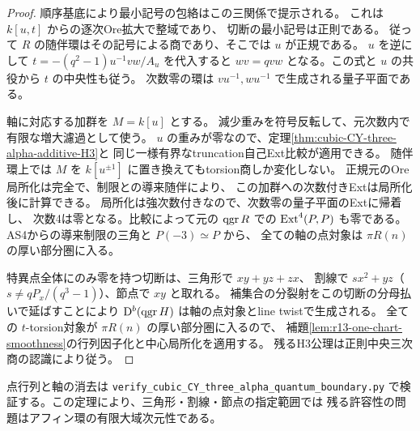 \begin{proof}
順序基底により最小記号の包絡はこの三関係で提示される。
これは $k[u,t]$ からの逐次Ore拡大で整域であり、
切断の最小記号は正則である。
従って $R$ の随伴環はその記号による商であり、そこでは $u$ が正規である。
$u$ を逆にして $t=- (q^2-1)u^{-1}vw/A_u$ を代入すると
$wv=qvw$ となる。この式と $u$ の共役から $t$ の中央性も従う。
次数零の環は $vu^{-1},wu^{-1}$ で生成される量子平面である。

軸に対応する加群を $M=k[u]$ とする。
減少重みを符号反転して、元次数内で有限な増大濾過として使う。
$u$ の重みが零なので、定理\ref{thm:cubic-CY-three-alpha-additive-H3}と
同じ一様有界なtruncation自己Ext比較が適用できる。
随伴環上では $M$ を $k[u^{\pm1}]$ に置き換えてもtorsion商しか変化しない。
正規元のOre局所化は完全で、制限との導来随伴により、
この加群への次数付きExtは局所化後に計算できる。
局所化は強次数付きなので、次数零の量子平面のExtに帰着し、
次数4は零となる。比較によって元の $\operatorname{qgr} R$ での $\operatorname{Ext}^4(P,P)$ も零である。
AS4からの導来制限の三角と $P(-3)\simeq P$ から、
全ての軸の点対象は $\pi R(n)$ の厚い部分圏に入る。

特異点全体にのみ零を持つ切断は、三角形で $xy+yz+zx$、
割線で $s x^2+yz$（$s\ne qP_x/(q^3-1)$）、節点で $xy$ と取れる。
補集合の分裂射をこの切断の分母払いで延ばすことにより
$\mathrm D^b(\operatorname{qgr} H)$ は軸の点対象とline twistで生成される。
全ての $t$-torsion対象が $\pi R(n)$ の厚い部分圏に入るので、
補題\ref{lem:r13-one-chart-smoothness}の行列因子化と中心局所化を適用する。
残るH3公理は正則中央三次商の認識により従う。
\end{proof}

点行列と軸の消去は
\texttt{verify\_cubic\_CY\_three\_alpha\_quantum\_boundary.py}
で検証する。この定理により、三角形・割線・節点の指定範囲では
残る許容性の問題はアフィン環の有限大域次元性である。

